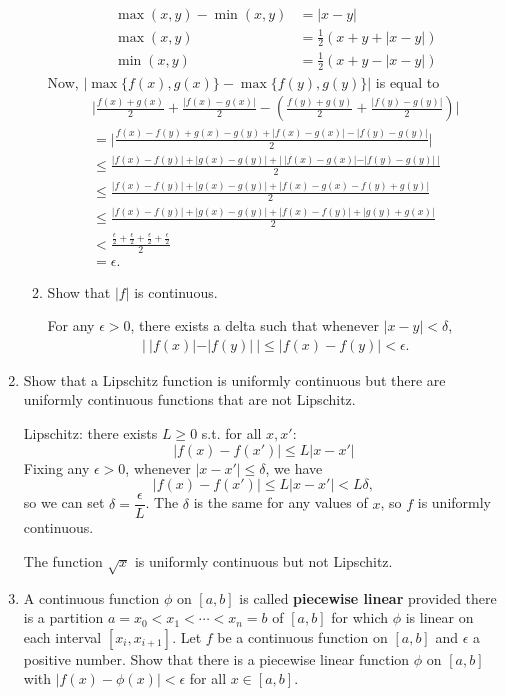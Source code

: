\begin{enumerate}
\begin{enumerate}[label=(\roman*),align=left]
\begin{align*}
		\max(x,y)-\min(x,y)&=|x-y|\\
		\max(x,y)&=\frac{1}{2}(x+y+|x-y|)\\
		\min(x,y)&=\frac{1}{2}(x+y-|x-y|)
		\end{align*}
		Now, $|\max\{f(x),g(x)\}-\max\{f(y),g(y)\}|$ is equal to
		\begin{align*}
			\biggl | \frac{f(x)+g(x)}{2}+\frac{|f(x)-g(x)|}{2} - (\frac{f(y)+g(y)}{2}+\frac{|f(y)-g(y)|}{2}) \biggr | \\
			= \biggl | \frac{f(x)-f(y)+g(x)-g(y)+|f(x)-g(x)|-|f(y)-g(y)|}{2} \biggr |\\
			\le \frac{|f(x)-f(y)|+|g(x)-g(y)|+ |\ |f(x)-g(x)|-|f(y)-g(y)|\ |}{2} \\
			\le \frac{|f(x)-f(y)|+|g(x)-g(y)|+ |f(x)-g(x)-f(y)+g(y)|}{2} \\
			\le \frac{|f(x)-f(y)|+|g(x)-g(y)|+ |f(x)-f(y)|+|g(y)+g(x)|}{2} \\
			< \frac{\frac{\epsilon}{2}+\frac{\epsilon}{2}+ \frac{\epsilon}{2}+\frac{\epsilon}{2}}{2} \\
			=\epsilon.
		\end{align*}
        \item Show that $|f|$ is continuous.\par
        For any $\epsilon>0$, there exists a delta such that whenever $|x-y|<\delta$,
        \begin{align*}
			|\ |f(x)|-|f(y)|\ |\le|f(x)-f(y)| <\epsilon.
		\end{align*}
    \end{enumerate}
	\item Show that a Lipschitz function is uniformly continuous but there are uniformly continuous functions that are not Lipschitz.\par
	Lipschitz: there exists $L\ge0$ s.t. for all $x,x'$:
	\[
		|f(x)-f(x')|\le L|x-x'|
	\]
	Fixing any $\epsilon>0$, whenever $|x-x'|\le\delta$, we have
	\[
		|f(x)-f(x')|\le L|x-x'|<L\delta,
	\]
	so we can set $\delta=\dfrac{\epsilon}{L}$.
	The $\delta$ is the same for any values of $x$, so $f$ is uniformly continuous.\par
	The function $\sqrt{x}$ is uniformly continuous but not Lipschitz.
	\item A continuous function $\phi$ on $[a,b]$ is called \textbf{piecewise linear} provided there is a partition $a=x_0<x_1< \cdots <x_n = b$ of $[a,b]$ for which $\phi$ is linear on each interval $[x_i, x_{i+1}]$. Let $f$ be a continuous function on $[a,b]$ and $\epsilon$ a positive number. 
	Show that there is a piecewise linear function $\phi$ on $[a,b]$ with $|f(x)-\phi (x)| < \epsilon$ for all $x \in [a,b]$.\\

\end{enumerate}
